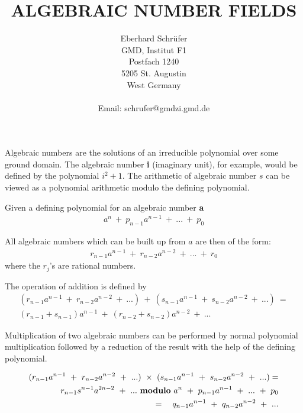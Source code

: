 

\title{ALGEBRAIC NUMBER FIELDS}
\author{
Eberhard Schr\"{u}fer \\
GMD, Institut F1   \\
Postfach 1240      \\
5205 St. Augustin  \\
West Germany       \\
                   \\
Email: schrufer@gmdzi.gmd.de \\
}

\maketitle

Algebraic numbers are the solutions of an irreducible polynomial over some
ground domain.  The algebraic number {\bf i} (imaginary unit), for example,
would be defined by the polynomial $i^2 + 1$.  The arithmetic of algebraic
number $s$ can be viewed as a polynomial arithmetic modulo the defining
polynomial.

Given a defining polynomial for an algebraic number {\bf a}
\begin{eqnarray*}
a^n ~ + ~ {p _{n-1}} {a ^ {n -1}} ~ + ~ ... ~ + ~ {p_0}
\end{eqnarray*}

All algebraic numbers which can be built up from $a$ are then of the form:
\begin{eqnarray*}
{r_{n-1}} {a ^{n-1}} ~+~ {r_{n-2}} {a ^{n-2}} ~+~ ... ~+~ {r_0}
\end{eqnarray*}
where the $r_j$'s are rational numbers.

The operation of addition is defined by
\begin{eqnarray*}
({r_{n-1}} {a ^{n-1}} ~+~ {r_{n-2}} {a ^{n-2}} ~+~ ...) ~ + ~
({s_{n-1}} {a ^{n-1}} ~+~ {s_{n-2}} {a ^{n-2}} ~+~ ...) ~ =  \\
({r_{n-1}+s_{n-1}}) {a ^{n-1}} ~+~ ({r_{n-2}+s_{n-2}}) {a ^{n-2}} ~+~ ...
\end{eqnarray*}

Multiplication of two algebraic numbers can be performed by normal
polynomial multiplication followed by a reduction of the result with the
help of the defining polynomial.

\begin{eqnarray*}
({r_{n-1}} {a ^{n-1}} ~+~ {r_{n-2}} {a ^{n-2}} ~+~ ...) ~ \times ~
({s_{n-1}} {a ^{n-1}} ~+~ {s_{n-2}} {a ^{n-2}} ~+~ ...) = \\
 {r_{n-1}} {s ^{n-1}}{a^{2n-2}} ~+~  ... ~ {\bf modulo} ~ 
a^n ~ + ~ {p _{n-1}} {a ^ {n -1}} ~ + ~ ... ~ + ~ {p_0} \\
= ~~~{q_{n-1}} a^{n-1} ~ + ~ {q _{n-2}} {a ^ {n -2}} ~ + ~ ...
\end{eqnarray*}



